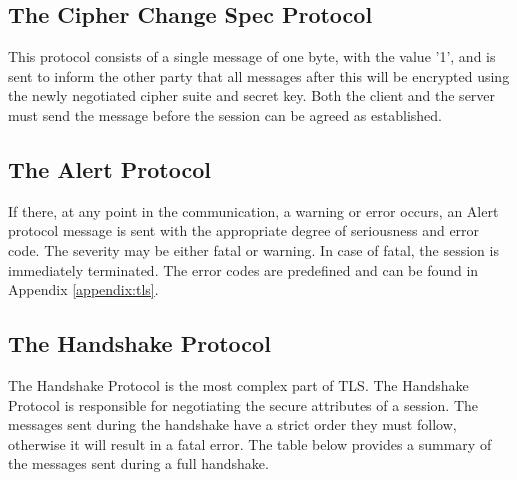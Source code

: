 \documentclass[12pt,a4paper,titlepage]{report}
\begin{document}

\subsection{The Cipher Change Spec Protocol}
This protocol consists of a single message of one byte, with the value '1', and is sent to inform the other party that all messages after this will be encrypted using the newly negotiated cipher suite and secret key. Both the client and the server must send the message before the session can be agreed as established. \cite{stallings,rfc2246}

\subsection{The Alert Protocol}
If there, at any point in the communication, a warning or error occurs, an Alert protocol message is sent with the appropriate degree of seriousness and error code. The severity may be either fatal or warning. In case of fatal, the session is immediately terminated. The error codes are predefined and can be found in Appendix \ref{appendix:tls}. \cite{stallings,rfc2246}

\subsection{The Handshake Protocol}
\label{sec:handshake}
The Handshake Protocol is the most complex part of TLS. The Handshake Protocol is responsible for negotiating the secure attributes of a session. The messages sent during the handshake have a strict order they must follow, otherwise it will result in a fatal error. The table below provides a summary of the messages sent during a full handshake.
\end{document}
